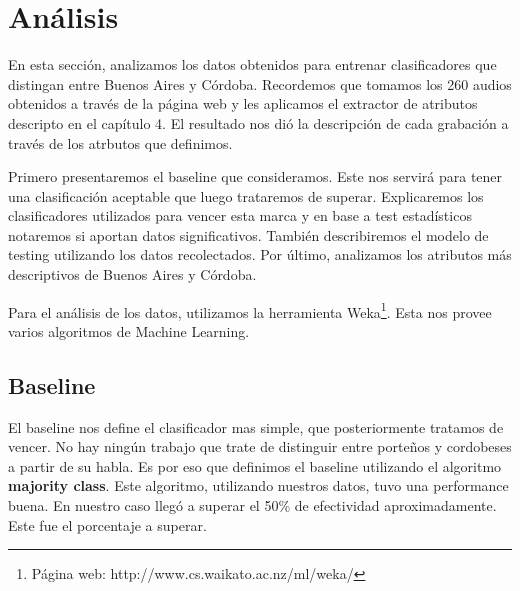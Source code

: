 \chapter{Análisis}

En esta sección, analizamos los datos obtenidos para entrenar clasificadores que distingan entre Buenos Aires y Córdoba. Recordemos que tomamos los 260 audios obtenidos a través de la página web y les aplicamos el extractor de atributos descripto en el capítulo 4. El resultado nos dió la descripción de cada grabación a través de los atrbutos que definimos. 

Primero presentaremos el baseline que consideramos. Este nos servirá para tener una clasificación aceptable que luego trataremos de superar. Explicaremos los clasificadores utilizados para vencer esta marca y en base a test estadísticos notaremos si aportan datos significativos. También describiremos el modelo de testing utilizando los datos recolectados. Por último, analizamos los atributos más descriptivos de Buenos Aires y Córdoba. 

Para el análisis de los datos, utilizamos la herramienta Weka\footnote{Página web: http://www.cs.waikato.ac.nz/ml/weka/}. Esta nos provee varios algoritmos de Machine Learning. 

\section{Baseline}

El baseline nos define el clasificador mas simple, que posteriormente tratamos de vencer. No hay ningún trabajo que trate de distinguir entre porteños y cordobeses a partir de su habla. Es por eso que definimos el baseline utilizando el algoritmo \textbf{majority class}. Este algoritmo, utilizando nuestros datos, tuvo una performance buena. En nuestro caso llegó a superar el 50\% de efectividad aproximadamente. Este fue el porcentaje a superar. 



